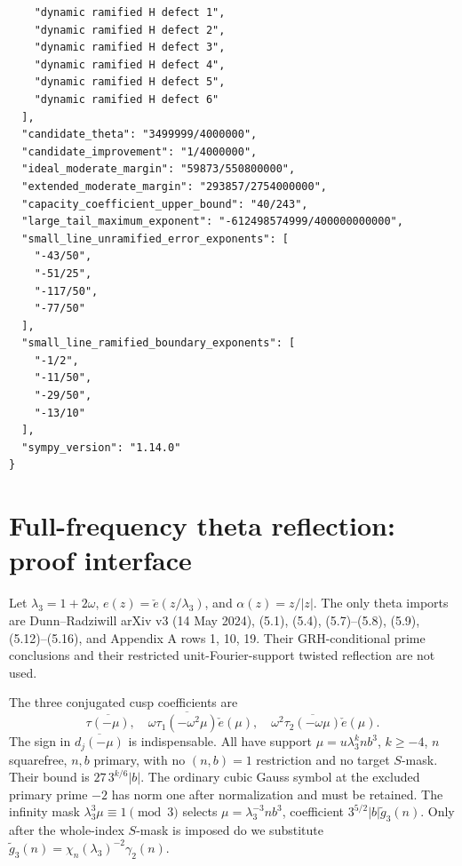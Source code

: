 \documentclass[12pt]{article}
\begin{document}
\begin{verbatim}
    "dynamic ramified H defect 1",
    "dynamic ramified H defect 2",
    "dynamic ramified H defect 3",
    "dynamic ramified H defect 4",
    "dynamic ramified H defect 5",
    "dynamic ramified H defect 6"
  ],
  "candidate_theta": "3499999/4000000",
  "candidate_improvement": "1/4000000",
  "ideal_moderate_margin": "59873/550800000",
  "extended_moderate_margin": "293857/2754000000",
  "capacity_coefficient_upper_bound": "40/243",
  "large_tail_maximum_exponent": "-612498574999/400000000000",
  "small_line_unramified_error_exponents": [
    "-43/50",
    "-51/25",
    "-117/50",
    "-77/50"
  ],
  "small_line_ramified_boundary_exponents": [
    "-1/2",
    "-11/50",
    "-29/50",
    "-13/10"
  ],
  "sympy_version": "1.14.0"
}
\end{verbatim}

\section{Full-frequency theta reflection: proof interface}

Let \(\lambda_3=1+2\omega\), \(e(z)=\check e(z/\lambda_3)\), and
\(\alpha(z)=z/|z|\).  The only theta imports are Dunn--Radziwill
arXiv v3 (14 May 2024), (5.1), (5.4), (5.7)--(5.8), (5.9),
(5.12)--(5.16), and Appendix A rows 1, 10, 19.
Their GRH-conditional prime conclusions and their restricted
unit-Fourier-support twisted reflection are not used.

The three conjugated cusp coefficients are
\[
 \overline{\tau(-\mu)},\quad
 \omega\overline{\tau_1(-\omega^2\mu)}\check e(\mu),\quad
 \omega^2\overline{\tau_2(-\omega\mu)}\check e(\mu).
\]
The sign in \(\overline{d_j(-\mu)}\) is indispensable.
All have support
\(\mu=u\lambda_3^k n b^3\), \(k\ge-4\), \(n\) squarefree,
\(n,b\) primary, with no \((n,b)=1\) restriction and no target
\(S\)-mask.  Their bound is \(27\,3^{k/6}|b|\).
The ordinary cubic Gauss symbol at the excluded primary prime
\(-2\) has norm one after normalization and must be retained.
The infinity mask \(\lambda_3^3\mu\equiv1\pmod3\) selects
\(\mu=\lambda_3^{-3}nb^3\), coefficient
\(3^{5/2}|b|\widetilde g_3(n)\).
Only after the whole-index \(S\)-mask is imposed do we substitute
\(\widetilde g_3(n)=\chi_n(\lambda_3)^{-2}\gamma_2(n)\).
\end{document}
